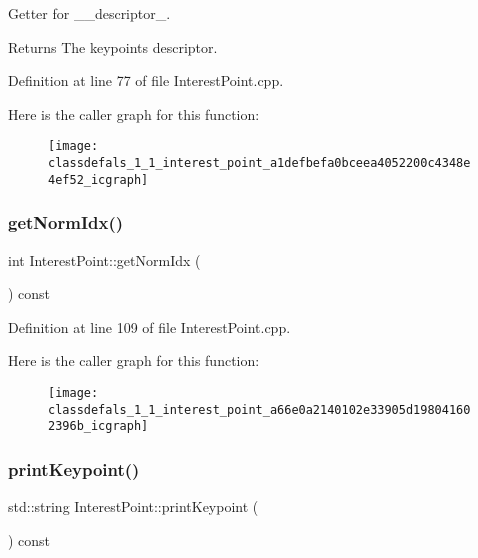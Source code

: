 Getter for \+\_\+\+\_\+descriptor\+\_\+.

\begin{DoxyReturn}{Returns}
The keypoint\textquotesingle{}s descriptor. 
\end{DoxyReturn}


Definition at line 77 of file Interest\+Point.\+cpp.

Here is the caller graph for this function\+:\nopagebreak
\begin{figure}[H]
\begin{center}
\leavevmode
\texttt{[image: classdefals\_1\_1\_interest\_point\_a1defbefa0bceea4052200c4348e4ef52\_icgraph]}
\end{center}
\end{figure}
\mbox{\label{classdefals_1_1_interest_point_a66e0a2140102e33905d198041602396b}} 
\subsubsection{\texorpdfstring{get\+Norm\+Idx()}{getNormIdx()}}
{\footnotesize\ttfamily int Interest\+Point\+::get\+Norm\+Idx (\begin{DoxyParamCaption}{ }\end{DoxyParamCaption}) const}



Definition at line 109 of file Interest\+Point.\+cpp.

Here is the caller graph for this function\+:\nopagebreak
\begin{figure}[H]
\begin{center}
\leavevmode
\texttt{[image: classdefals\_1\_1\_interest\_point\_a66e0a2140102e33905d198041602396b\_icgraph]}
\end{center}
\end{figure}
\mbox{\label{classdefals_1_1_interest_point_af99319f9c5cd2126719d1ec804572a3f}} 
\subsubsection{\texorpdfstring{print\+Keypoint()}{printKeypoint()}}
{\footnotesize\ttfamily std\+::string Interest\+Point\+::print\+Keypoint (\begin{DoxyParamCaption}{ }\end{DoxyParamCaption}) const}

